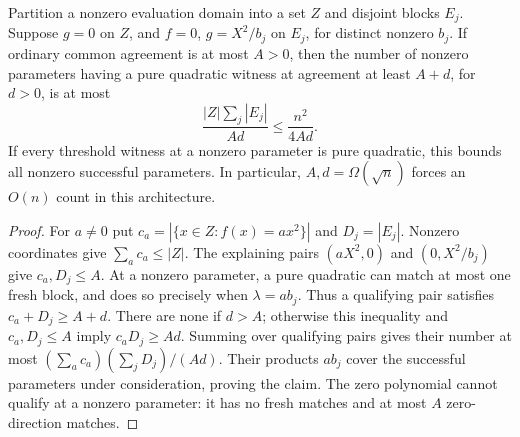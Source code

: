 \begin{proposition}
\label{prop:scalar-block-resource-bound}
Partition a nonzero evaluation domain into a set $Z$ and disjoint
blocks $E_j$.  Suppose $g=0$ on $Z$, and $f=0$, $g=X^2/b_j$ on
$E_j$, for distinct nonzero $b_j$.  If ordinary common agreement
is at most $A>0$, then the number of nonzero parameters having a
pure quadratic witness at agreement at least $A+d$, for $d>0$, is
at most
\[
 \frac{|Z|\sum_j|E_j|}{Ad}\le\frac{n^2}{4Ad}.
\]
If every threshold witness at a nonzero parameter is pure quadratic,
this bounds all nonzero successful parameters.  In particular,
$A,d=\Omega(\sqrt n)$ forces an $O(n)$ count in this architecture.
\end{proposition}
\begin{proof}
For $a\ne0$ put $c_a=|\{x\in Z:f(x)=ax^2\}|$ and $D_j=|E_j|$.
Nonzero coordinates give $\sum_a c_a\le|Z|$.  The explaining pairs
$(aX^2,0)$ and $(0,X^2/b_j)$ give $c_a,D_j\le A$.
At a nonzero parameter, a pure quadratic can match at most one
fresh block, and does so precisely when $\lambda=ab_j$.
Thus a qualifying pair satisfies $c_a+D_j\ge A+d$.
There are none if $d>A$; otherwise this inequality and
$c_a,D_j\le A$ imply $c_aD_j\ge Ad$.
Summing over qualifying pairs gives their number at most
$(\sum_a c_a)(\sum_jD_j)/(Ad)$.  Their products $ab_j$ cover
the successful parameters under consideration, proving the claim.
The zero polynomial cannot qualify at a nonzero parameter: it has
no fresh matches and at most $A$ zero-direction matches.
\end{proof}

